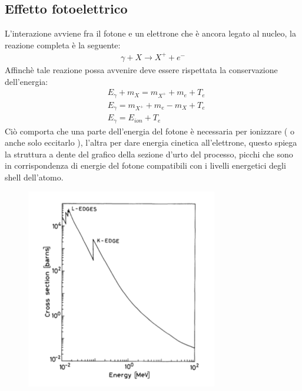 \subsection{Effetto fotoelettrico}
L'interazione avviene fra il fotone e un elettrone che è ancora legato al nucleo, la reazione 
completa è la seguente:
\begin{align*}
    \gamma+X\rightarrow X^{+}+e^{-}
\end{align*}
Affinchè tale reazione possa avvenire deve essere rispettata la conservazione dell'energia:
\begin{align*}
    &E_{\gamma}+m_{X}=m_{X^{+}}+m_{e}+T_{e}\\
    &E_{\gamma} = m_{X^{+}}+m_{e}-m_{X}+T_{e}\\
    &E_{\gamma} = E_{ion}+T_{e}
\end{align*}
Ciò comporta che una parte dell'energia del fotone è necessaria per ionizzare ( o anche solo eccitarlo ),
l'altra per dare energia cinetica all'elettrone, questo spiega la struttura a dente del grafico
della sezione d'urto del processo, picchi che sono in corrispondenza di energie del fotone 
compatibili con i livelli energetici degli shell dell'atomo.
\begin{figure}[!h]
    \centering
    \includegraphics[scale=0.5]{ch6InterazioneMateria/Fotoelettrico}
\end{figure}
\newpage

